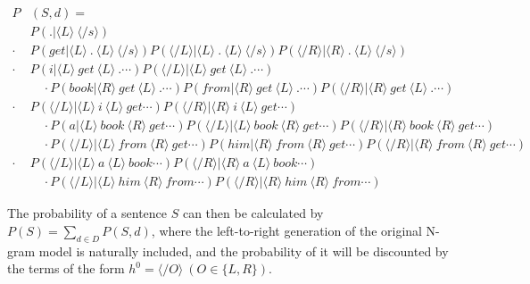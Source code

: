 \documentclass[english]{jnlp_1.4}
\begin{document}
{\small \begin{align}
 P &(S, d) = \nonumber \\ 
   & P (. | \langle L \rangle \ \langle \slash s \rangle) \label{layer1}\\ 
\cdot & P (get | \langle L \rangle \ . \ \langle L \rangle \ \langle \slash s \rangle) P (\langle \slash L \rangle | \langle L \rangle \ . \ \langle L \rangle \ \langle \slash s \rangle)
	P (\langle \slash R \rangle | \langle R \rangle \ . \ \langle L \rangle \ \langle \slash s \rangle) \\
\cdot & P (i | \langle L \rangle \ get \ \langle L \rangle \ .\cdots) P (\langle \slash L \rangle | \langle L \rangle \ get \ \langle L \rangle\ .\cdots) \label {layer3} \nonumber \\
 & \quad \cdot P (book | \langle R \rangle \ get \ \langle L \rangle\ .\cdots) P (from | \langle R \rangle \ get \ \langle L \rangle \ .\cdots) P (\langle \slash R \rangle | \langle R \rangle \ get \ \langle L \rangle \ .\cdots) \\
 \cdot & P (\langle \slash L \rangle | \langle L \rangle \ i \ \langle L \rangle \ get\cdots) P (\langle \slash R \rangle | \langle R \rangle \ i \ \langle L \rangle \ get\cdots) \nonumber \\
 & \quad \cdot P (a | \langle L \rangle \ book \ \langle R \rangle \ get\cdots) P (\langle \slash L \rangle | \langle L \rangle \ book \ \langle R \rangle \ get\cdots) P (\langle \slash R \rangle | \langle R \rangle \ book \ \langle R \rangle \ get\cdots) \nonumber \\
 & \quad  \cdot P (\langle \slash L \rangle | \langle L \rangle \ from \ \langle R \rangle \ get\cdots) P (him | \langle R \rangle \ from \ \langle R \rangle \ get\cdots) P (\langle \slash R \rangle | \langle R \rangle \ from \ \langle R \rangle \ get\cdots) \\
 \cdot & P (\langle \slash L \rangle | \langle L \rangle \ a \ \langle L \rangle \ book\cdots) P (\langle \slash R \rangle | \langle R \rangle \ a \ \langle L \rangle \ book\cdots) \nonumber \\ 
 & \quad \cdot P (\langle \slash L \rangle | \langle L \rangle \ him \ \langle R \rangle \ from\cdots) P (\langle \slash R \rangle | \langle R \rangle \ him \ \langle R \rangle \ from\cdots) \label{layer5}
\end{align}}


The probability of a sentence $S$ can then be calculated by $P(S)=\sum_{d \in D} P (S, d)$, where the left-to-right generation of the original N-gram model is naturally included, and the probability of it will be discounted by the terms of the form $h^0 = \langle \slash O \rangle\ (O \in \{L, R\})$.
\end{document}
